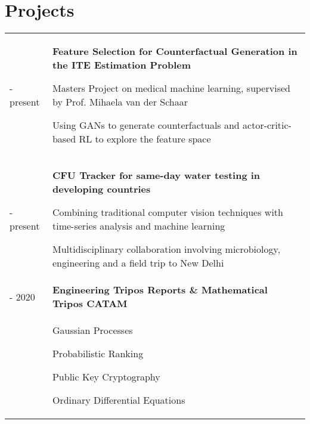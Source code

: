 \documentclass[letterpaper, 10pt]{article}
\begin{document}
\section*{Projects}
\begin{tabularx}{\linewidth}{>{\raggedleft}p{2.2cm}|X X}
2019 - present & \multicolumn{2}{p{\linegoal}}{
    \vspace{-2.9mm}\textbf{Feature Selection for Counterfactual Generation in the ITE Estimation Problem}
    \begin{compact}
        \item Masters Project on medical machine learning, supervised by Prof. Mihaela van der Schaar
        \item Using GANs to generate counterfactuals and actor-critic-based RL to explore the feature space
        \vspace{-.5\baselineskip}
    \end{compact}
}\\
2017 - present & \multicolumn{2}{p{\linegoal}}{
	\vspace{-2.9mm}\textbf{CFU Tracker for same-day water testing in developing countries}
	\begin{compact}
		\item Combining traditional computer vision techniques with time-series analysis and machine learning
		\item Multidisciplinary collaboration involving microbiology, engineering and a field trip to New Delhi
		\vspace{-.5\baselineskip}
	\end{compact}
}\\
2016 - 2020 & \multicolumn{2}{l}{\textbf{Engineering Tripos Reports \& Mathematical Tripos CATAM}}\\&
\begin{compact}
	\vspace{-.5\baselineskip}
    \item Gaussian Processes
    \item Probabilistic Ranking
    \item Public Key Cryptography
    \item Ordinary Differential Equations

\end{compact}
\end{tabularx}
\end{document}
